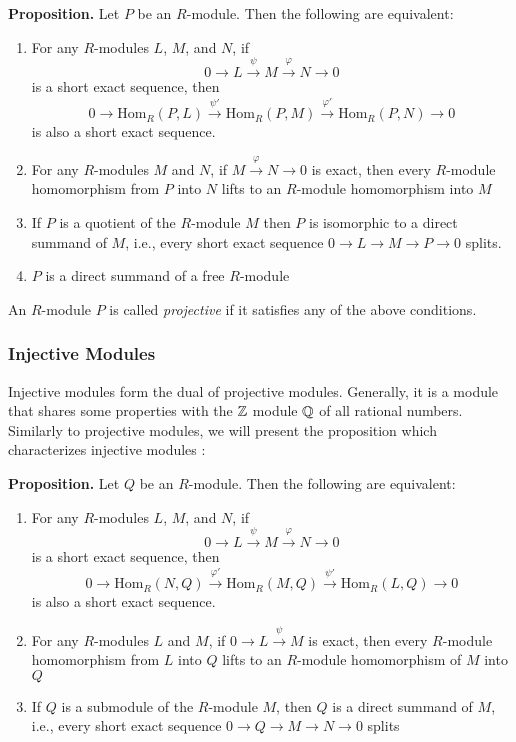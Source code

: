 \documentclass[11pt, reqno]{amsart}
\theoremstyle{plain}
\theoremstyle{definition}
\theoremstyle{example}
\def\Hom{\mathrm{Hom}}
\begin{document}
\par
\textbf{Proposition.} Let $P$ be an $R$-module. Then the following are equivalent:
\begin{enumerate}
\item For any $R$-modules $L$, $M$, and $N$, if $$0 \rightarrow L \xrightarrow{\psi} M \xrightarrow{\varphi} N \rightarrow 0$$ is a short exact sequence, then $$0 \rightarrow \Hom_R(P, L) \xrightarrow{\psi'} \Hom_R(P, M) \xrightarrow{\varphi'} \Hom_R(P, N) \rightarrow 0$$ is also a short exact sequence.

\item For any $R$-modules $M$ and $N$, if $M \xrightarrow{\varphi} N \rightarrow 0$ is exact, then every $R$-module homomorphism from $P$ into $N$ lifts to an $R$-module homomorphism into $M$

\item If $P$ is a quotient of the $R$-module $M$ then $P$ is isomorphic to a direct summand of $M$, i.e., every short exact sequence $0 \rightarrow L \rightarrow M \rightarrow P \rightarrow 0$ splits.

\item $P$ is a direct summand of a free $R$-module
\end{enumerate}

An $R$-module $P$ is called \textit{projective} if it satisfies any of the above conditions.

\subsubsection{Injective Modules}

Injective modules form the dual of projective modules. Generally, it is a module that shares some properties with the $\mathbb{Z}$ module $\mathbb{Q}$ of all rational numbers. Similarly to projective modules, we will present the proposition which characterizes injective modules \cite[\S 10.5, p. 394]{dummit}:

\newpage
\textbf{Proposition.} Let $Q$ be an $R$-module. Then the following are equivalent:
\begin{enumerate}
\item For any $R$-modules $L$, $M$, and $N$, if $$0 \rightarrow L \xrightarrow{\psi} M \xrightarrow{\varphi} N \rightarrow 0$$ is a short exact sequence, then $$0 \rightarrow \Hom_R(N, Q) \xrightarrow{\varphi'} \Hom_R(M, Q) \xrightarrow{\psi'} \Hom_R(L, Q) \rightarrow 0$$ is also a short exact sequence.

\item For any $R$-modules $L$ and $M$, if $0 \rightarrow L \xrightarrow{\psi} M$ is exact, then every $R$-module homomorphism from $L$ into $Q$ lifts to an $R$-module homomorphism of $M$ into $Q$

\item If $Q$ is a submodule of the $R$-module $M$, then $Q$ is a direct summand of $M$, i.e., every short exact sequence $0 \rightarrow Q \rightarrow M \rightarrow N \rightarrow 0$ splits
\end{enumerate}
\end{document}
